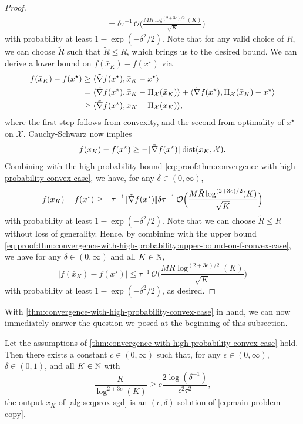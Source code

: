 \begin{proof}
\begin{align}
        &=
        \delta \tau^{-1} \,
        \mathcal{O}\Big( \frac{M\tilde{R} \log^{(2 + 3e) / 2}(K)}{\sqrt{K}} \Big)
    \end{align}
    with probability at least $1 - \exp(-\delta^2/2)$.
    Note that for any valid choice of $R$, we can choose $\tilde{R}$ such that 
    $\tilde{R} \leq R$, which brings us to the desired bound.
    We can derive a lower bound on $f(\bar{x}_K) - f(x^\star)$ via
    \begin{align*}
        f(\bar{x}_K) - f(x^\star) &\geq \langle \tilde{\nabla} f(x^\star), \bar{x}_K - x^\star \rangle \\
                            &= \langle \tilde{\nabla} f(x^\star), \bar{x}_K - \operatorname{\Pi_\mathcal{X}}(\bar{x}_K) \rangle
                                + \langle \tilde{\nabla} f(x^\star), \operatorname{\Pi_\mathcal{X}}(\bar{x}_K) - x^\star \rangle \\
                            &\geq \langle \tilde{\nabla} f(x^\star), \bar{x}_K - \operatorname{\Pi_\mathcal{X}}(\bar{x}_K) \rangle,
    \end{align*}
    where the first step follows from convexity, and the second from optimality of $x^\star$ on $\mathcal{X}$.
    Cauchy-Schwarz now implies
    \[
        f(\bar{x}_K) - f(x^\star) \geq - |\!|\tilde{\nabla} f(x^\star)|\!| \operatorname{dist}(\bar{x}_K, \mathcal{X}).
    \]
    Combining with the high-probability bound \eqref{eq:proof:thm:convergence-with-high-probability-convex-case}, we have,
    for any $\delta\in(0, \infty)$,
    \[
        f(\bar{x}_K) - f(x^\star)
        \geq - \tau^{-1} |\!|\tilde{\nabla} f(x^\star)|\!|
            \delta \tau^{-1} \, \mathcal{O}\Big( \frac{M\tilde{R} \log^{(2 + 3e) / 2}(K)}{\sqrt{K}} \Big)
    \]
    with probability at least $1 - \exp(-\delta^2/2)$. Note that we can choose $\tilde{R} \leq R$
    without loss of generality. Hence, by combining with the upper bound \eqref{eq:proof:thm:convergence-with-high-probability:upper-bound-on-f-convex-case},
    we have for any $\delta\in(0,\infty)$ and all $K\in\mathbb{N}$,
    \[
        |f(\bar{x}_K) - f(x^\star)|
        \leq
        \tau^{-1} \, \mathcal{O}\Big( \frac{M R \log^{(2 + 3e) / 2}(K)}{\sqrt{K}} \Big)
    \]
    with probability at least $1 - \exp(-\delta^2/2)$, as desired.
\end{proof}

With \cref{thm:convergence-with-high-probability-convex-case} in hand, we can now immediately
answer the question we posed at the beginning of this subsection.

\begin{corollary}
    Let the assumptions of \cref{thm:convergence-with-high-probability-convex-case} hold.
    Then there exists a constant
    $c\in(0,\infty)$ such that, for any $\epsilon\in(0,\infty)$, $\delta\in(0,1)$,
    and all $K\in\mathbb{N}$ with
    \[
        \frac{K}{\log^{2+3e}(K)} \geq c\frac{2\log(\delta^{-1})}{\epsilon^2\tau^2},
    \]
    the output $\bar{x}_K$ of \cref{alg:seqprox-sgd} is an $(\epsilon, \delta)$-solution of
    \eqref{eq:main-problem-copy}.
\end{corollary}

